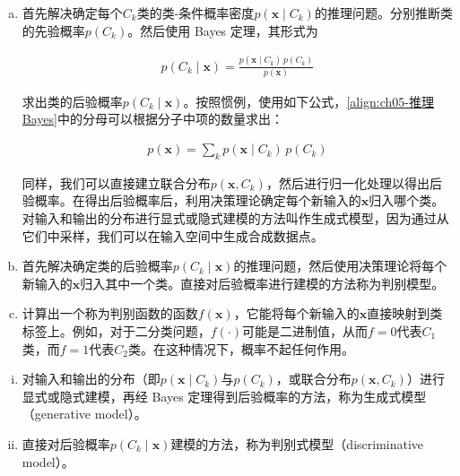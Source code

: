 \documentclass[../../main.tex]{subfiles}
\begin{document}
\begin{enumerate}[(a)]
  \item 首先解决确定每个$C_k$类的类-条件概率密度$p(\boldsymbol{x}\mid C_k)$的推理问题。分别推断类的先验概率$p(C_k)$。然后使用 Bayes 定理，其形式为

  \begin{align}
    p(C_k\mid\boldsymbol{x})=\frac{p(\boldsymbol{x}\mid C_k)\,p(C_k)}{p(\boldsymbol{x})}
    \label{align:ch05-推理Bayes}
  \end{align}

  求出类的后验概率$p(C_k\mid\boldsymbol{x})$。按照惯例，使用如下公式，\eqref{align:ch05-推理Bayes}中的分母可以根据分子中项的数量求出：

  \begin{align}
    p(\boldsymbol{x})=\sum_{k}p(\boldsymbol{x}\mid C_k)\,p(C_k)
    \label{align:ch05-推理分母}
  \end{align}

  同样，我们可以直接建立联合分布$p(\boldsymbol{x},C_k)$，然后进行归一化处理以得出后验概率。在得出后验概率后，利用决策理论确定每个新输入的$\boldsymbol{x}$归入哪个类。对输入和输出的分布进行显式或隐式建模的方法叫作生成式模型，因为通过从它们中采样，我们可以在输入空间中生成合成数据点。

  \item 首先解决确定类的后验概率$p(C_k\mid\boldsymbol{x})$的推理问题，然后使用决策理论将每个新输入的$\boldsymbol{x}$归入其中一个类。直接对后验概率进行建模的方法称为判别模型。

  \item 计算出一个称为判别函数的函数$f(\boldsymbol{x})$，它能将每个新输入的$\boldsymbol{x}$直接映射到类标签上。例如，对于二分类问题，$f(\cdot)$可能是二进制值，从而$f=0$代表$C_1$类，而$f=1$代表$C_2$类。在这种情况下，概率不起任何作用。
\end{enumerate}

\begin{definition}[生成式模型与判别式模型]\label{definition:ch05-生成与判别模型}
\begin{enumerate}[(i)]
  \item 对输入和输出的分布（即$p(\boldsymbol{x}\mid C_k)$与$p(C_k)$，或联合分布$p(\boldsymbol{x},C_k)$）进行显式或隐式建模，再经 Bayes 定理得到后验概率的方法，称为生成式模型（generative model）。
  \item 直接对后验概率$p(C_k\mid\boldsymbol{x})$建模的方法，称为判别式模型（discriminative model）。
\end{enumerate}
\end{definition}
\end{document}
